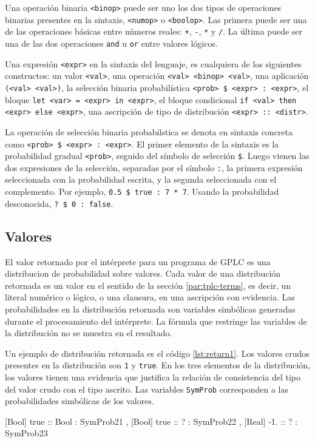 Una operación binaria \lstinline|<binop>| puede ser uno los dos tipos de operaciones binarias presentes en la sintaxis, \lstinline|<numop>| o \lstinline|<boolop>|. Las primera puede ser una de las operaciones básicas entre números reales: \lstinline|+|, \lstinline|-|, \lstinline|*| y \lstinline|/|. La última puede ser una de las dos operaciones \lstinline|and| u \lstinline|or| entre valores lógicos.

Una expresión \lstinline|<expr>| en la sintaxis del lenguaje, es cualquiera de los siguientes constructos: un valor \lstinline|<val>|, una operación \lstinline|<val> <binop> <val>|, una aplicación \lstinline|(<val> <val>)|, la selección binaria probabilística \lstinline|<prob> $ <expr> : <expr>|, el bloque \lstinline|let <var> = <expr> in <expr>|, el bloque condicional \lstinline|if <val> then <expr> else <expr>|, una ascripción de tipo de distribución \lstinline|<expr> :: <distr>|.

La operación de selección binaria probabilstica se denota en sintaxis
concreta como \lstinline|<prob> $ <expr> : <expr>|.  El primer
elemento de la sintaxis es la probabilidad gradual \lstinline|<prob>|,
seguido del símbolo de selección \lstinline|$|. Luego vienen las dos
expresiones de la selección, separadas por el símbolo \lstinline|:|,
la primera expresión seleccionada con la probabilidad escrita, y la
segunda seleccionada con el complemento. Por ejemplo,
\lstinline|0.5 $ true : 7 * 7|. Usando la probabilidad desconocida,
\lstinline|? $ 0 : false|.





\subsection{Valores}\label{sec:concreto-valor}
El valor retornado por el intérprete para un programa de GPLC es una
distribucion de probabilidad sobre valores. Cada valor de una
distribución retornada es un valor en el sentido de la sección
\ref{par:tplc-terms}, es decir, un literal numérico o lógico, o
una clausura, en una ascripción con evidencia. Las probabilidades en la distribución retornada son variables simbólicas generadas durante el
procesamiento del intérprete. La fórmula que restringe las variables de la distribución no se muestra en el resultado.

Un ejemplo de distribución retornada es el código \ref{lst:return1}. Los valores crudos presentes en la distribución son \lstinline|1| y \lstinline|true|. En los tres elementos de la distribución, los valores tienen una evidencia que justifica la relación de consistencia del tipo del valor crudo con el tipo ascrito. Las variables \lstinline|SymProb| corresponden a las probabilidades simbólicas de los valores.
\begin{gplcblock}[style=gplc-style,caption={choice 5.1},label={lst:return1}]
{
	 [Bool] true :: Bool : SymProb21 ,
	 [Bool] true :: ? : SymProb22 ,
	 [Real] -1. :: ? : SymProb23 
}  
\end{gplcblock}

